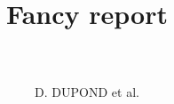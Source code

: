\documentclass[12pt,french]{report}
\title{
    \HRule \\[0.4cm] \Huge \bfseries 
    Fancy report
    \\[0.15cm] \HRule \\[0.4cm]}
\author{\Large D. DUPOND et al.}
\begin{document}
\maketitle

\dominitoc %
\large \tableofcontents
\normalsize %

\renewcommand{\chaptermark}[1]{ \markboth{#1}{} }
\pagestyle{fancy}
\fancyhead{} %
\fancyhead[RO,LE]{\leftmark}
\fancyfoot{} %

\makeatletter
\renewcommand{\@evenfoot}{\makebox[\textwidth][c]{page {\thepage} sur \pageref{LastPage}}}
\renewcommand{\@oddfoot}{\@evenfoot}
\makeatother

\renewcommand{\labelitemi}{$\bullet$}
\renewcommand{\labelitemii}{---}
\renewcommand{\labelitemiii}{-}
\renewcommand{\labelitemiv}{.}





\end{document}
